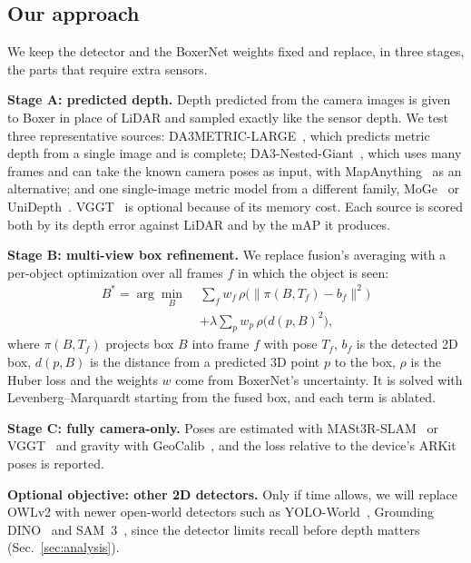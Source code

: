 \documentclass[conference]{IEEEtran}
\begin{document}
\subsection{Our approach}
We keep the detector and the BoxerNet weights fixed and replace, in three stages, the parts that require extra sensors.

\textbf{Stage A: predicted depth.} Depth predicted from the camera images is given to Boxer in place of LiDAR and sampled exactly like the sensor depth. We test three representative sources: DA3METRIC-LARGE~\cite{da3}, which predicts metric depth from a single image and is complete; DA3-Nested-Giant~\cite{da3}, which uses many frames and can take the known camera poses as input, with MapAnything~\cite{mapanything} as an alternative; and one single-image metric model from a different family, MoGe~\cite{moge} or UniDepth~\cite{unidepth}. VGGT~\cite{vggt} is optional because of its memory cost. Each source is scored both by its depth error against LiDAR and by the mAP it produces.

\textbf{Stage B: multi-view box refinement.} We replace fusion's averaging with a per-object optimization over all frames $f$ in which the object is seen:
\begin{equation}
\begin{split}
B^* = \arg\min_B\; &\sum_f w_f\,\rho\big(\lVert \pi(B,T_f)-b_f\rVert^2\big)\\
&+ \lambda \sum_p w_p\,\rho\big(d(p,B)^2\big),
\end{split}
\label{eq:refine}
\end{equation}
where $\pi(B,T_f)$ projects box $B$ into frame $f$ with pose $T_f$, $b_f$ is the detected 2D box, $d(p,B)$ is the distance from a predicted 3D point $p$ to the box, $\rho$ is the Huber loss and the weights $w$ come from BoxerNet's uncertainty. It is solved with Levenberg--Marquardt starting from the fused box, and each term is ablated.

\textbf{Stage C: fully camera-only.} Poses are estimated with MASt3R-SLAM~\cite{mast3rslam} or VGGT~\cite{vggt} and gravity with GeoCalib~\cite{geocalib}, and the loss relative to the device's ARKit poses is reported.

\textbf{Optional objective: other 2D detectors.} Only if time allows, we will replace OWLv2 with newer open-world detectors such as YOLO-World~\cite{yoloworld}, Grounding DINO~\cite{groundingdino} and SAM~3~\cite{sam3}, since the detector limits recall before depth matters (Sec.~\ref{sec:analysis}).
\end{document}
